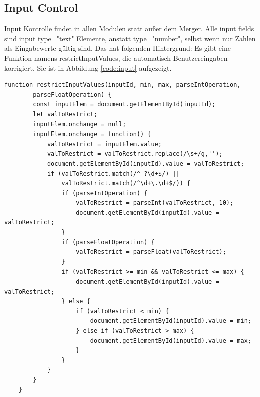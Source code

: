 \subsection{Input Control}
Input Kontrolle findet in allen Modulen statt außer dem Merger. Alle input fields sind input type="text" Elemente, anstatt type="number", selbst wenn nur Zahlen als Eingabewerte gültig sind. Das hat folgenden Hintergrund: Es gibt eine Funktion namens restrictInputValues, die automatisch Benutzereingaben korrigiert. Sie ist in Abbildung \ref{code:input} aufgezeigt.

\begin{lstlisting}[style=ES6, caption={Funktion für Inputkontrolle und Benutzereingabekorrekturen}, label=code:input]
	function restrictInputValues(inputId, min, max, parseIntOperation, 
		parseFloatOperation) {
		const inputElem = document.getElementById(inputId);
		let valToRestrict;
		inputElem.onchange = null;
		inputElem.onchange = function() {
			valToRestrict = inputElem.value;
			valToRestrict = valToRestrict.replace(/\s+/g,'');
			document.getElementById(inputId).value = valToRestrict;
			if (valToRestrict.match(/^-?\d+$/) || 
				valToRestrict.match(/^\d+\.\d+$/)) {
				if (parseIntOperation) {
					valToRestrict = parseInt(valToRestrict, 10);
					document.getElementById(inputId).value = valToRestrict;
				} 
				if (parseFloatOperation) {
					valToRestrict = parseFloat(valToRestrict);
				}
				if (valToRestrict >= min && valToRestrict <= max) {
					document.getElementById(inputId).value = valToRestrict;
				} else {
					if (valToRestrict < min) {
						document.getElementById(inputId).value = min;
					} else if (valToRestrict > max) {
						document.getElementById(inputId).value = max;
					}
				}
			}
		}
	}
\end{lstlisting} 
 
